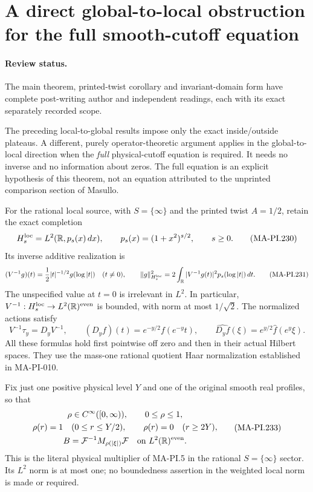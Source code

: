 \section{A direct global-to-local obstruction for the full smooth-cutoff equation}
\label{sec:direct-projection-intertwiner-obstruction}

\paragraph{Review status.}
The main theorem, printed-twist corollary and invariant-domain
form have complete post-writing author and independent
readings, each with its exact separately recorded scope.

The preceding local-to-global results impose only the exact
inside/outside plateaus. A different, purely operator-theoretic
argument applies in the global-to-local direction when the
\emph{full} physical-cutoff equation is required. It needs no
inverse and no information about zeros. The full equation is
an explicit hypothesis of this theorem, not an equation
attributed to the unprinted comparison section of Masullo.

For the rational local source, with $S=\{\infty\}$ and the
printed twist $A=1/2$, retain the exact completion
\[
 H_s^{\rm loc}=L^2(\mathbb R,p_s(x)\,dx),\qquad
 p_s(x)=(1+x^2)^{s/2},\qquad s\ge0.
 \tag{MA-PI.230}
\]
Its inverse additive realization is
\[
 (V^{-1}g)(t)=\frac12|t|^{-1/2}g(\log|t|)
                  \quad(t\ne0),
 \qquad
 \|g\|_{H_s^{\rm loc}}^2
       =2\int_{\mathbb R}|V^{-1}g(t)|^2
                         p_s(\log|t|)\,dt.
 \tag{MA-PI.231}
\]
The unspecified value at $t=0$ is irrelevant in $L^2$.
In particular, $V^{-1}:H_s^{\rm loc}\to L^2(\mathbb R)^{\rm even}$
is bounded, with norm at most $1/\sqrt2$.
The normalized actions satisfy
\[
 V^{-1}\tau_y=D_yV^{-1},\qquad
 (D_yf)(t)=e^{-y/2}f(e^{-y}t),\qquad
 \widehat{D_yf}(\xi)=e^{y/2}\widehat f(e^y\xi).
 \tag{MA-PI.232}
\]
All these formulas hold first pointwise off zero and then
in their actual Hilbert spaces. They use the mass-one
rational quotient Haar normalization established in MA-PI-010.

Fix just one positive physical level $Y$ and one of the
original smooth real profiles, so that
\[
 \begin{gathered}
  \rho\in C^\infty([0,\infty)),\qquad 0\le\rho\le1,\\
  \rho(r)=1\quad(0\le r\le Y/2),\qquad
  \rho(r)=0\quad(r\ge2Y),\\
  B=\mathcal F^{-1}M_{\rho(|\xi|)}\mathcal F
           \quad\hbox{on }L^2(\mathbb R)^{\rm even}.
 \end{gathered}
 \tag{MA-PI.233}
\]
This is the literal physical multiplier of MA-PI.5 in the
rational $S=\{\infty\}$ sector. Its $L^2$ norm is at most
one; no boundedness assertion in the weighted local norm
is made or required.

